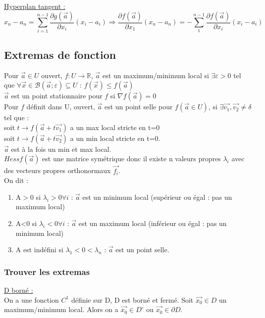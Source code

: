 \documentclass[../main.tex]{subfiles}
\begin{document}
\quad \underline{Hyperplan tangent :}\\
\begin{equation}
    x_n - a_n = \sum_{i=1}^{n-1} \frac{\partial g(\vec{a})}{\partial x_i}(x_i - a_i) \Rightarrow \frac{\partial f(\vec{a})}{\partial x_1}(x_n-a_n) = -\sum_1^{n-1} \frac{\partial f(\vec{a})}{\partial x_i} (x_i-a_i)
\end{equation}

\subsection{Extremas de fonction}
Pour $\vec{a}\in U$ ouvert, $f:U\rightarrow \mathbb{R}$, $\vec{a}$ est un maximum/minimum local si $\exists \varepsilon > 0$ tel que $\forall \vec{x} \in \mathcal{B}(\vec{a}; \varepsilon) \subseteq U$ : $f(\vec{x}) \leq f(\vec{a})$\\

$\vec{a}$ est un point stationnaire pour $f$ si $\nabla f(\vec{a}) = 0$\\

Pour $f$ définit dans U, ouvert, $\vec{a}$ est un point selle pour $f (\vec{a} \in U)$, si $\exists \vec{v_1}, \vec{v_2} \neq \delta$ tel que :\\
soit $t\rightarrow f(\vec{a} +t\vec{v_1})$ a un max local stricte en t=0\\
soit $t\rightarrow f(\vec{a} + t\vec{v_2})$ a un min local stricte en t=0.\\
$\vec{a}$ est à la fois un  min et max local.\\
$Hess f(\vec{a})$ est une matrice symétrique donc il existe n valeurs propres $\lambda_i$ avec des vecteurs propres orthonormaux $\vec{f_i}$.\\
On dit : \\
\begin{enumerate}
    \item A$> 0$ si $\lambda_i > 0 \forall i$ : $\vec{a}$ est un minimum local (supérieur ou égal : pas un maximum local)\\
    \item A<0 si $\lambda_i < 0 \forall i$ : $\vec{a}$ est un maximum local (inférieur ou égal : pas un minimum local)\\
    \item A est indéfini si $\lambda_1 < 0 < \lambda_n$ : $\vec{a}$ est un point selle.\\
\end{enumerate}

\subsubsection{Trouver les extremas}
\quad \underline{D borné :}\\
On a une fonction $C^1$ définie sur D, D est borné et fermé. Soit $\vec{x_0} \in D$ un maximum/minimum local. Alors on a $\vec{x_0} \in D^{\circ}$ ou $\vec{x_0}\in \partial D$.\\
\end{document}
